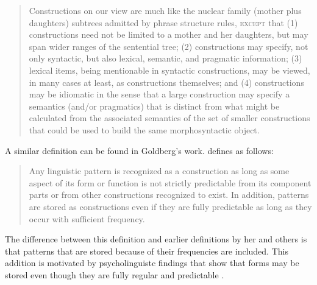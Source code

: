 \documentclass[output=paper]{langsci/langscibook}
\begin{document}
\begin{quote}\label{def-construction-fillmore}
Constructions on our view are much like the nuclear family (mother plus daughters) subtrees
admitted by phrase structure rules, \textsc{except} that (1) constructions need not be limited to a mother
and her daughters, but may span wider ranges of the sentential tree; (2) constructions may specify,
not only syntactic, but also lexical, semantic, and pragmatic information; (3) lexical items,
being mentionable in syntactic constructions, may be viewed, in many cases at least, as
constructions themselves; and (4) constructions may be idiomatic in the sense that a large
construction may specify a semantics (and/or pragmatics) that is distinct from what might be
calculated from the associated semantics of the set of smaller constructions that could be used to
build the same morphosyntactic object. \citep[]{FKoC88a}
\end{quote}
A similar definition can be found in Goldberg's work. \citet[]{Goldberg2006a} defines  as follows:
\begin{quote}
Any linguistic pattern is recognized as a construction as long as some aspect of its form or
function is not strictly predictable from its component parts or from other constructions recognized
to exist. In addition, patterns are stored as constructions even if they are fully predictable as
long as they occur with sufficient frequency. \citep[]{Goldberg2006a}
\end{quote}
The difference between this definition and earlier definitions by her and others is that patterns
that are stored because of their frequencies are included. This addition is motivated by
psycholinguistc findings that show that forms may be stored even though they are fully regular and
predictable \parencites{Bybee95a-u}[]{PJ2005a}.
%
\end{document}
